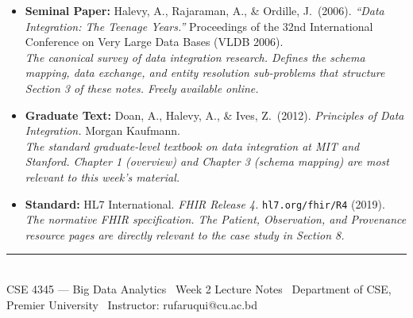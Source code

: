 \documentclass[12pt,a4paper]{article}
\begin{document}
\begin{itemize}[leftmargin=2em, itemsep=6pt]
  \item \textbf{Seminal Paper:} Halevy, A., Rajaraman, A., \& Ordille, J.\ (2006). \textit{``Data Integration: The Teenage Years.''} Proceedings of the 32nd International Conference on Very Large Data Bases (VLDB 2006).\\
        \small\textit{The canonical survey of data integration research.  Defines the schema mapping, data exchange, and entity resolution sub-problems that structure Section 3 of these notes.  Freely available online.}

  \item \textbf{Graduate Text:} Doan, A., Halevy, A., \& Ives, Z.\ (2012). \textit{Principles of Data Integration.} Morgan Kaufmann.\\
        \small\textit{The standard graduate-level textbook on data integration at MIT and Stanford.  Chapter 1 (overview) and Chapter 3 (schema mapping) are most relevant to this week's material.}

  \item \textbf{Standard:} HL7 International. \textit{FHIR Release 4.} \texttt{hl7.org/fhir/R4} (2019).\\
        \small\textit{The normative FHIR specification.  The Patient, Observation, and Provenance resource pages are directly relevant to the case study in Section 8.}
\end{itemize}

\vspace{12pt}
\noindent\rule{\linewidth}{0.8pt}\\[4pt]
{\small\textcolor{PUGray}{CSE 4345 — Big Data Analytics \textbar\ Week 2 Lecture Notes \textbar\
Department of CSE, Premier University \textbar\ Instructor: rufaruqui@cu.ac.bd}}
\end{document}
